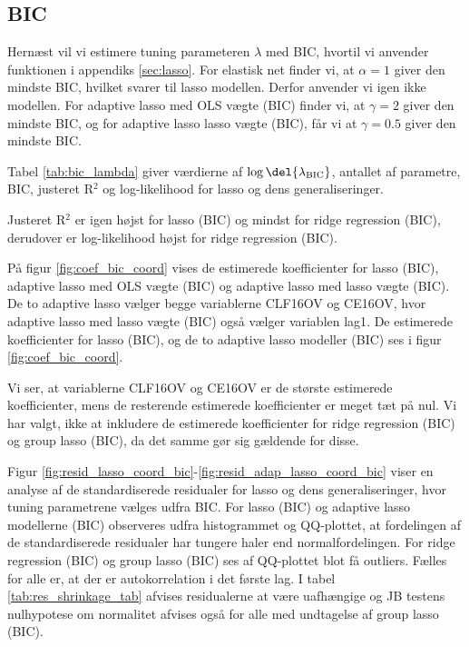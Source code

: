 \subsection{BIC}
Hernæst vil vi estimere tuning parameteren \(\lambda\) med BIC, hvortil vi anvender funktionen i appendiks \ref{sec:lasso}.
For elastisk net finder vi, at $\alpha = 1$ giver den mindste BIC, hvilket svarer til lasso modellen. Derfor anvender vi igen ikke modellen. 
For adaptive lasso med OLS vægte (BIC) finder vi, at $\gamma = 2$ giver den mindste BIC, og for adaptive lasso lasso vægte (BIC), får vi at $\gamma = 0.5$ giver den mindste BIC. 

Tabel \ref{tab:bic_lambda} giver værdierne af $\log \del{ \lambda_\text{BIC}}$, antallet af parametre, BIC, justeret R$^2$ og log-likelihood for lasso og dens generaliseringer. 

Justeret R$^2$ er igen højst for  lasso (BIC) og mindst for ridge regression (BIC), derudover er log-likelihood højst for ridge regression (BIC). 



På figur \ref{fig:coef_bic_coord} vises de estimerede koefficienter for lasso (BIC), adaptive lasso med OLS vægte (BIC) og adaptive lasso med lasso vægte (BIC).
De to adaptive lasso vælger begge variablerne  \textcolor{blue3}{CLF16OV} og \textcolor{blue3}{CE16OV}, hvor adaptive lasso med lasso vægte  (BIC) også vælger variablen \textcolor{blue3}{lag1}. 
De estimerede koefficienter for lasso (BIC), og de to adaptive lasso modeller (BIC) ses i figur \ref{fig:coef_bic_coord}. 

Vi ser, at variablerne \textcolor{blue3}{CLF16OV} og \textcolor{blue3}{CE16OV} er de største estimerede koefficienter, mens de resterende estimerede koefficienter er meget tæt på nul. 
Vi har valgt, ikke at inkludere de estimerede koefficienter for ridge regression (BIC) og group lasso (BIC), da det samme gør sig gældende for disse.


Figur \ref{fig:resid_lasso_coord_bic}-\ref{fig:resid_adap_lasso_coord_bic} viser en analyse af de standardiserede residualer for lasso og dens generaliseringer, hvor tuning parametrene vælges udfra BIC.
For lasso (BIC) og adaptive lasso modellerne (BIC) observeres udfra histogrammet og QQ-plottet, at fordelingen af de standardiserede residualer har tungere haler end normalfordelingen.
For ridge regression (BIC) og group lasso (BIC) ses af QQ-plottet blot få outliers.
Fælles for alle er, at der er autokorrelation i det første lag. 
I tabel \ref{tab:res_shrinkage_tab} afvises residualerne at være uafhængige og JB testens nulhypotese om normalitet afvises også for alle med undtagelse af group lasso (BIC).


